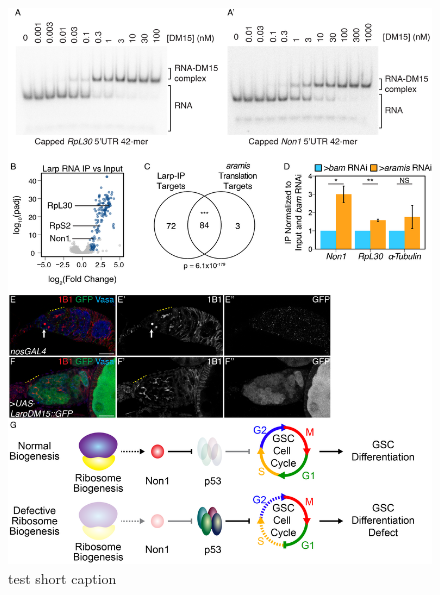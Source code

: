\documentclass[12pt,oneside]{reedthesis}
\begin{document}
\begin{figure}

{\centering \includegraphics[width=6.5 in,height=8.9375 in]{./figure/Ribosome Biogenesis/Ribosome Biogenesis 7} 

}

\caption[test short caption]{test short caption}\label{fig:unnamed-chunk-18}
\end{figure}
\end{document}
